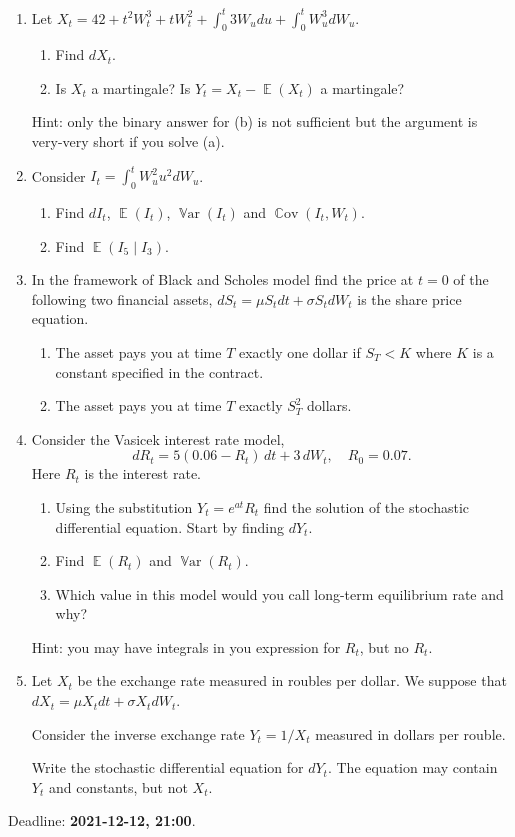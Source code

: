 \documentclass[12pt]{article}
\DeclareMathOperator{\Cov}{\mathbb{C}ov}
\DeclareMathOperator{\Var}{\mathbb{V}ar}
\DeclareMathOperator{\E}{\mathbb{E}}
\begin{document}
\begin{enumerate}
\item Let $X_t = 42 + t^2W_t^3 + tW_t^2 + \int_0^t 3W_u du + \int_0^t W_u^3 dW_u$.
\begin{enumerate}
  \item Find $dX_t$.
  \item Is $X_t$ a martingale? Is $Y_t = X_t - \E(X_t)$ a martingale? 
\end{enumerate}

Hint: only the binary answer for (b) is not sufficient but the argument is very-very short if you solve (a). 

\item Consider $I_t = \int_0^t W_u^2 u^2 dW_u$. 

\begin{enumerate}
  \item Find $dI_t$, $\E(I_t)$, $\Var(I_t)$ and $\Cov(I_t, W_t)$.
  \item Find $\E(I_5 \mid I_3)$.
\end{enumerate}


\item In the framework of Black and Scholes model find the price at $t=0$ of the following two 
financial assets, $dS_t = \mu S_t dt + \sigma S_t dW_t$ is the share price equation. 
\begin{enumerate}
  \item The asset pays you at time $T$ exactly one dollar if $S_T < K$ where $K$ is a constant 
  specified in the contract. 
  \item The asset pays you at time $T$ exactly $S_T^2$ dollars.
\end{enumerate}



\item Consider the Vasicek interest rate model, 
\[
  dR_t=5(0.06 - R_t) \, dt + 3 \, dW_t, \quad R_0 = 0.07.
\]
Here $R_t$ is the interest rate.
\begin{enumerate}
\item Using the substitution $Y_t=e^{at} R_t$ find the solution of the stochastic differential equation.
Start by finding $dY_t$. 
\item Find $\E(R_t)$ and $\Var(R_t)$.
\item Which value in this model would you call long-term equilibrium rate and why?
\end{enumerate}

Hint: you may have integrals in you expression for $R_t$, but no $R_t$.

\item Let $X_t$ be the exchange rate measured in roubles per dollar. 
We suppose that $dX_t = \mu X_t dt + \sigma X_t dW_t$. 

Consider the inverse exchange rate $Y_t = 1/X_t$ measured in dollars per rouble. 

Write the stochastic differential equation for $dY_t$. 
The equation may contain $Y_t$ and constants, but not $X_t$.


\end{enumerate}


Deadline: \textbf{2021-12-12, 21:00}. 
\end{document}
